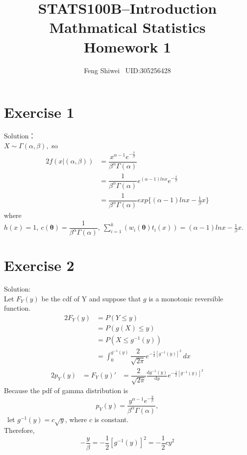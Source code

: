 \documentclass[a4papers]{ctexart}
\title{STATS100B--Introduction Mathmatical Statistics \\Homework 1}
\author{Feng Shiwei \ UID:305256428}
\date{}
\begin{document}
\maketitle
\section*{Exercise 1}
\noindent Solution：\\
\indent 
$X\sim \Gamma(\alpha,\beta),$ so
\begin{alignat*}{2}
    f(x|(\alpha,\beta))&=\dfrac{x^{\alpha-1}e^{-\frac{x}{\beta}}}{\beta^\alpha\Gamma(\alpha)}\\
    &= \dfrac{1}{\beta^\alpha\Gamma(\alpha)}e^{(\alpha-1)lnx}e^{-\frac{x}{\beta}}\\
    &= \dfrac{1}{\beta^\alpha\Gamma(\alpha)}exp\{(\alpha-1)lnx-\frac{1}{\beta}x\}
\end{alignat*}
where $h(x)=1,\ c(\boldsymbol{\theta})=\dfrac{1}{\beta^\alpha\Gamma(\alpha)},\ 
\sum_{i=1}^{k}\left(w_i(\boldsymbol{\theta})t_i(x) \right)=(\alpha-1)lnx-\frac{1}{\beta}x.$

\section*{Exercise 2}
\noindent Solution:\\
\indent Let $F_Y(y)$ be the cdf of Y and suppose that $g$ is a monotonic reversible function.
\begin{alignat*}{2}
   F_Y(y) &= P(Y \le y)\\
          &= P(g(X) \le y)\\
          &= P(X \le g^{-1}(y))\\
          &= \int_{0}^{g^{-1}(y)}\dfrac{2}{\sqrt{2\pi}}e^{-\frac{1}{2}[g^{-1}(y)]^2}\,dx
\end{alignat*}
\begin{alignat*}{2}
    p_Y(y) &= F_Y(y)'
           &= \dfrac{2}{\sqrt{2\pi}}\frac{\mathrm{d}g^{-1}(y)}{\mathrm{d}y}e^{-\frac{1}{2}[g^{-1}(y)]^2}
\end{alignat*}
Because the pdf of gamma distribution is \[ p_Y(y) = \dfrac{y^{\alpha-1}e^{-\frac{y}{\beta}}}{\beta^\alpha\Gamma(\alpha)}, \]\,
let $g^{-1}(y)=c\sqrt{y}$,  where $c$ is constant.\\
Therefore, \[ -\dfrac{y}{\beta} = -\frac{1}{2}[g^{-1}(y)]^2 = -\frac{1}{2}cy^2 \]
\end{document}
